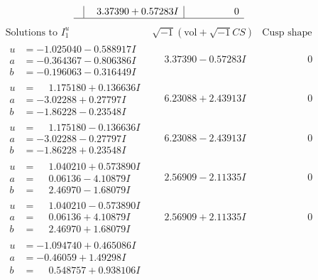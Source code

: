 \documentclass[1p]{elsarticle_modified}
\theoremstyle{definition}
\newcommand{\I}{\sqrt{-1}}
\begin{document}
$$\begin{array}{c|c|c}
 & \phantom{-}3.37390 + 0.57283 I & \phantom{-0.000000 } 0\\
 \hline 
 \end{array}$$\newpage$$\begin{array}{c|c|c}  
\text{Solutions to }I^u_{1}& \I (\text{vol} + \sqrt{-1}CS) & \text{Cusp shape}\\
 \hline 
\begin{aligned}
u &= -1.025040 - 0.588917 I \\
a &= -0.364367 - 0.806386 I \\
b &= -0.196063 - 0.316449 I\end{aligned}
 & \phantom{-}3.37390 - 0.57283 I & \phantom{-0.000000 } 0 \\ \hline\begin{aligned}
u &= \phantom{-}1.175180 + 0.136636 I \\
a &= -3.02288 + 0.27797 I \\
b &= -1.86228 - 0.23548 I\end{aligned}
 & \phantom{-}6.23088 + 2.43913 I & \phantom{-0.000000 } 0 \\ \hline\begin{aligned}
u &= \phantom{-}1.175180 - 0.136636 I \\
a &= -3.02288 - 0.27797 I \\
b &= -1.86228 + 0.23548 I\end{aligned}
 & \phantom{-}6.23088 - 2.43913 I & \phantom{-0.000000 } 0 \\ \hline\begin{aligned}
u &= \phantom{-}1.040210 + 0.573890 I \\
a &= \phantom{-}0.06136 - 4.10879 I \\
b &= \phantom{-}2.46970 - 1.68079 I\end{aligned}
 & \phantom{-}2.56909 - 2.11335 I & \phantom{-0.000000 } 0 \\ \hline\begin{aligned}
u &= \phantom{-}1.040210 - 0.573890 I \\
a &= \phantom{-}0.06136 + 4.10879 I \\
b &= \phantom{-}2.46970 + 1.68079 I\end{aligned}
 & \phantom{-}2.56909 + 2.11335 I & \phantom{-0.000000 } 0 \\ \hline\begin{aligned}
u &= -1.094740 + 0.465086 I \\
a &= -0.46059 + 1.49298 I \\
b &= \phantom{-}0.548757 + 0.938106 I\end{aligned}

\end{array}$$
\end{document}

